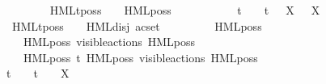 \begin{isabellebody}
\ \ {\isacharbar}{\kern0pt}\ {\isacartoucheopen}{\isasymalpha}\ {\isacharequal}{\kern0pt}\ {\isasymtau}\ {\isasymLongrightarrow}\isanewline
\ \ \ \ \ \ {\isasymsigma}{\isacharparenleft}{\kern0pt}HMLt{\isacharunderscore}{\kern0pt}poss\ {\isasymalpha}\ {\isasymphi}{\isacharparenright}{\kern0pt}\ {\isacharequal}{\kern0pt}\ HML{\isacharunderscore}{\kern0pt}poss\ {\isasymalpha}\ {\isasymsigma}{\isacharparenleft}{\kern0pt}{\isasymphi}{\isacharparenright}{\kern0pt}{\isacartoucheclose}\isanewline
\ \ {\isacharbar}{\kern0pt}\ {\isacartoucheopen}{\isasymalpha}\ {\isasymnoteq}\ {\isasymtau}\ {\isasymand}\ {\isasymalpha}\ {\isasymnoteq}\ t\ {\isasymand}\ {\isasymalpha}\ {\isasymnoteq}\ t{\isacharunderscore}{\kern0pt}{\isasymepsilon}\ {\isasymand}\ {\isacharparenleft}{\kern0pt}{\isasymforall}\ X{\isachardot}{\kern0pt}\ {\isasymalpha}\ {\isasymnoteq}\ {\isasymepsilon}{\isacharbrackleft}{\kern0pt}X{\isacharbrackright}{\kern0pt}{\isacharparenright}{\kern0pt}\ {\isasymLongrightarrow}\isanewline
\ \ \ \ \ \ {\isasymsigma}{\isacharparenleft}{\kern0pt}HMLt{\isacharunderscore}{\kern0pt}poss\ {\isasymalpha}\ {\isasymphi}{\isacharparenright}{\kern0pt}\ {\isacharequal}{\kern0pt}\ HML{\isacharunderscore}{\kern0pt}disj\ {\isacharparenleft}{\kern0pt}acset\ {\isacharbraceleft}{\kern0pt}\isanewline
\ \ \ \ \ \ \ \ HML{\isacharunderscore}{\kern0pt}poss\ {\isasymalpha}\ {\isasymsigma}{\isacharparenleft}{\kern0pt}{\isasymphi}{\isacharparenright}{\kern0pt}{\isacharcomma}{\kern0pt}\isanewline
\ \ \ \ \ \ \ \ HML{\isacharunderscore}{\kern0pt}poss\ {\isasymepsilon}{\isacharbrackleft}{\kern0pt}visible{\isacharunderscore}{\kern0pt}actions{\isacharbrackright}{\kern0pt}\ {\isacharparenleft}{\kern0pt}HML{\isacharunderscore}{\kern0pt}poss\ {\isasymalpha}\ {\isasymsigma}{\isacharparenleft}{\kern0pt}{\isasymphi}{\isacharparenright}{\kern0pt}{\isacharparenright}{\kern0pt}{\isacharcomma}{\kern0pt}\isanewline
\ \ \ \ \ \ \ \ HML{\isacharunderscore}{\kern0pt}poss\ t{\isacharunderscore}{\kern0pt}{\isasymepsilon}\ {\isacharparenleft}{\kern0pt}HML{\isacharunderscore}{\kern0pt}poss\ {\isasymepsilon}{\isacharbrackleft}{\kern0pt}visible{\isacharunderscore}{\kern0pt}actions{\isacharbrackright}{\kern0pt}\ {\isacharparenleft}{\kern0pt}HML{\isacharunderscore}{\kern0pt}poss\ {\isasymalpha}\ {\isasymsigma}{\isacharparenleft}{\kern0pt}{\isasymphi}{\isacharparenright}{\kern0pt}{\isacharparenright}{\kern0pt}{\isacharparenright}{\kern0pt}\isanewline
\ \ \ \ \ \ {\isacharbraceright}{\kern0pt}{\isacharparenright}{\kern0pt}{\isacartoucheclose}\isanewline
\ \ {\isacharbar}{\kern0pt}\ {\isacartoucheopen}{\isasymalpha}\ {\isacharequal}{\kern0pt}\ t\ {\isasymor}\ {\isasymalpha}\ {\isacharequal}{\kern0pt}\ t{\isacharunderscore}{\kern0pt}{\isasymepsilon}\ {\isasymor}\ {\isasymalpha}\ {\isacharequal}{\kern0pt}\ {\isasymepsilon}{\isacharbrackleft}{\kern0pt}X{\isacharbrackright}{\kern0pt}\ {\isasymLongrightarrow}\isanewline

\end{isabellebody}
